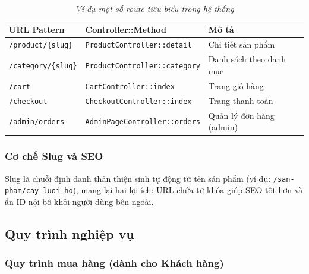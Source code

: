 \documentclass[11pt, a4paper]{article}
\begin{document}
\begin{table}[H]
    \centering
    \footnotesize
    \setlength{\tabcolsep}{2pt}
    \renewcommand{\arraystretch}{1.8}
    \caption{\textit{Ví dụ một số route tiêu biểu trong hệ thống}}
    \vspace{0.3cm}
    \begin{tabularx}{\linewidth}{|>{\raggedright\arraybackslash}p{2.2cm}
                                  |>{\raggedright\arraybackslash}p{3.5cm}
                                  |Y|}
        \hline
        \textbf{URL Pattern} & \textbf{Controller::Method} & \textbf{Mô tả} \\ \hline
        \texttt{/product/\{slug\}} & \texttt{ProductController::detail} & Chi tiết sản phẩm \\ \hline
        \texttt{/category/\{slug\}} & \texttt{ProductController::category} & Danh sách theo danh mục \\ \hline
        \texttt{/cart} & \texttt{CartController::index} & Trang giỏ hàng \\ \hline
        \texttt{/checkout} & \texttt{CheckoutController::index} & Trang thanh toán \\ \hline
        \texttt{/admin/orders} & \texttt{AdminPageController::orders} & Quản lý đơn hàng (admin) \\ \hline
    \end{tabularx}
\end{table}

\subsubsection{Cơ chế Slug và SEO}

Slug là chuỗi định danh thân thiện sinh tự động từ tên sản phẩm (ví dụ: \texttt{/san-pham/cay-luoi-ho}), mang lại hai lợi ích: URL chứa từ khóa giúp SEO tốt hơn và ẩn ID nội bộ khỏi người dùng bên ngoài.

\subsection{Quy trình nghiệp vụ}

\subsubsection{Quy trình mua hàng (dành cho Khách hàng)}
\end{document}
